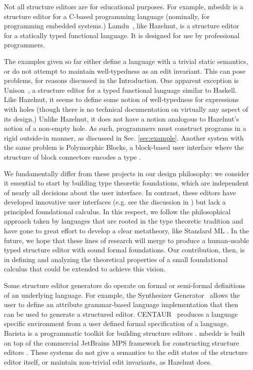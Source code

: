 \documentclass[preprint,9pt]{sigplanconf}
\begin{document}
Not all structure editors are for educational purposes. For example,
mbeddr \cite{voelter_mbeddr:_2012} is a structure editor for a C-based
programming language (nominally, for programming embedded systems.)
Lamdu~\cite{lamdu}, like Hazelnut, is a structure editor for a statically
typed functional language. It is designed for use by professional
programmers.

The examples given so far either define a language with a trivial static
semantics, or do not attempt to maintain well-typedness as an edit
invariant. This can pose problems, for reasons discussed in the
Introduction. One apparent exception is Unison~\cite{unison}, a structure
editor for a typed functional language similar to Haskell. Like Hazelnut,
it seems to define some notion of well-typedness for expressions with holes
(though there is no technical documentation on virtually any aspect of its
design.) Unlike Hazelnut, it does not have a notion analogous to Hazelnut's
notion of a non-empty hole. As such, programmers must construct programs in
a rigid outside-in manner, as discussed in Sec. \ref{sec:example}. Another
system with the same problem is Polymorphic Blocks, a block-based user
interface where the structure of block connectors encodes a
type \cite{DBLP:conf/chi/LernerFG15}.

We fundamentally differ from these projects in our design philosophy: we
consider it essential to start by building type theoretic foundations,
which are independent of nearly all decisions about the user interface. In
contrast, these editors have developed innovative user interfaces (e.g. see
the discussion in \cite{DBLP:conf/sle/VolterSBK14}) but lack a principled
foundational calculus. In this respect, we follow the philosophical
approach taken by languages that are rooted in the type theoretic tradition
and have gone to great effort to develop a clear metatheory, like Standard
ML \cite{mthm97-for-dart,Harper00atype-theoretic}.  In the future, we hope
that these lines of research will merge to produce a human-usable typed
structure editor with sound formal foundations. Our contribution, then, is
in defining and analyzing the theoretical properties of a small
foundational calculus that could be extended to achieve this vision.

Some structure editor generators do operate on formal or semi-formal
definitions of an underlying language. For example, the Synthesizer
Generator~\cite{Reps:1984:SG:390010.808247} allows the user to define an
attribute grammar-based language implementation that then can be used to
generate a structured editor. CENTAUR~\cite{Borras:1988:CS:64140.65005}
produces a language specific environment from a user defined formal
specification of a language. Barista is a programmatic toolkit for building
structure editors \cite{ko_barista:_2006}. mbeddr is built on top of the
commercial JetBrains MPS framework for constructing structure
editors \cite{voelter2011language,DBLP:journals/software/VoelterWK15}. These
systems do not give a semantics to the edit states of the structure editor
itself, or maintain non-trivial edit invariants, as Hazelnut does.
\end{document}

